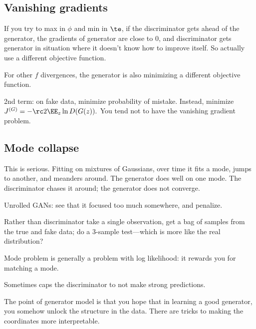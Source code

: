 \subsection{Vanishing gradients}
If you try to max in $\phi$ and min in $\te$, if the discriminator gets ahead of the generator, the
 gradients of generator are close to 0, and discriminator gets generator in situation where it doesn't know how to improve itself. So actually use a different objective function.
 
For other $f$ divergences, the generator is also minimizing a different objective function. %
 
2nd term: on fake data, minimize probability of mistake. Instead, minimize
$J^{(G)} = -\rc2 \EE_{z}\ln D(G(z)).$
You tend not to have the vanishing gradient problem.

\subsection{Mode collapse}

This is serious. Fitting on mixtures of Gaussians, over time it fits a mode, jumps to another, and meanders around. The generator does well on one mode. The discriminator chases it around; the generator does not converge.

Unrolled GANs: see that it focused too much somewhere, and penalize. 

Rather than discriminator take a single observation, get a bag of samples from the true and fake data; do a 3-sample test---which is more like the real distribution?



Mode problem is generally a problem with log likelihood: it rewards you for matching a mode.

 Sometimes caps the discriminator to not make strong predictions.                                                                         



The point of generator model is that you hope that in learning a good generator, you somehow unlock the structure in the data. There are tricks to making the coordinates more interpretable.

